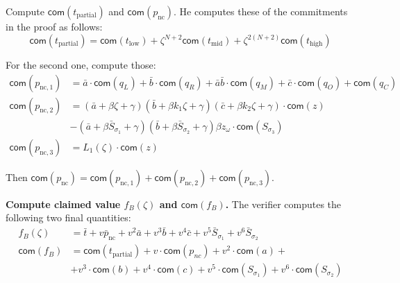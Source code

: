 \documentclass[../lecture-notes.tex]{subfiles}
\begin{document}
Compute $\mathsf{com}(t_{\text{partial}})$ and
$\mathsf{com}(p_{\text{nc}})$. He computes these of the commitments in the
proof as follows:
\begin{equation*}
    \mathsf{com}(t_{\text{partial}}) = \mathsf{com}(t_{\text{low}}) + \zeta^{N+2}\mathsf{com}(t_{\text{mid}}) + \zeta^{2(N+2)}\mathsf{com}(t_{\text{high}})
\end{equation*}

For the second one, compute those:
\begin{align*}
\mathsf{com}(p_{\text{nc},1}) &= \bar{a}\cdot\mathsf{com}(q_L) + \bar{b} \cdot \mathsf{com}(q_R) + \bar{a}\bar{b} \cdot \mathsf{com}(q_M) + \bar{c} \cdot \mathsf{com}(q_O) + \mathsf{com}(q_C) \\
\mathsf{com}(p_{\text{nc},2}) &= (\bar{a} + \beta \zeta + \gamma)(\bar{b} + \beta k_1 \zeta + \gamma)(\bar{c} + \beta k_2 \zeta + \gamma) \cdot\mathsf{com}(z) \\ 
&- (\bar{a} + \beta \bar{S}_{\sigma_1} + \gamma)(\bar{b} + \beta \bar{S}_{\sigma_2} + \gamma)\beta z_{\omega}\cdot \mathsf{com}(S_{\sigma_3}) \\
\mathsf{com}(p_{\text{nc},3}) &= L_1(\zeta)\cdot\mathsf{com}(z)
\end{align*}

Then $\mathsf{com}(p_{\text{nc}}) = \mathsf{com}(p_{\text{nc},1}) + \mathsf{com}(p_{\text{nc},2}) + \mathsf{com}(p_{\text{nc},3})$.

\textcolor{blue!60!black}{\textbf{Compute claimed value $f_{B}(\zeta)$ and $\mathsf{com}(f_{B})$.}} The verifier computes 
the following two final quantities:
\begin{align*}
f_{B}(\zeta) &= \bar{t} + v \bar{p}_{\text{nc}} + v^2 \bar{a} + v^3 \bar{b} + v^4 \bar{c} + v^5 \bar{S}_{\sigma_1} + v^6 \bar{S}_{\sigma_2} \\
\mathsf{com}(f_{B}) &= \mathsf{com}(t_{\text{partial}}) + v \cdot \mathsf{com}(p_{nc}) + v^2 \cdot \mathsf{com}(a) + \\
&+ v^3 \cdot \mathsf{com}(b) + v^4 \cdot \mathsf{com}(c) + v^5 \cdot \mathsf{com}(S_{\sigma_1}) + v^6 \cdot \mathsf{com}(S_{\sigma_2})
\end{align*}
\end{document}
